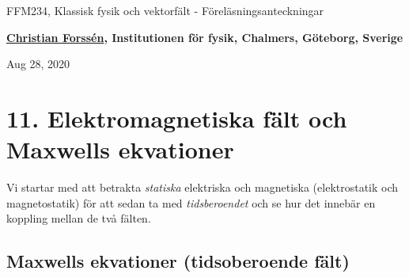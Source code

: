 \documentclass[%
oneside,                 %
final,                   %
10pt]{article}
\begin{document}

\newcommand{\exercisesection}[1]{\subsection*{#1}}







\thispagestyle{empty}

\begin{center}
{\LARGE\bf
\begin{spacing}{1.25}
FFM234, Klassisk fysik och vektorfält - Föreläsningsanteckningar
\end{spacing}
}
\end{center}


\begin{center}
{\bf \href{{http://fy.chalmers.se/subatom/tsp/}}{Christian Forssén}, Institutionen för fysik, Chalmers, Göteborg, Sverige${}^{}$} \\ [0mm]
\end{center}

\begin{center}
\end{center}
    

\begin{center}
Aug 28, 2020
\end{center}

\vspace{1cm}


\section*{11. Elektromagnetiska fält och Maxwells ekvationer}

Vi startar med att betrakta \emph{statiska} elektriska och magnetiska (elektrostatik och magnetostatik) för att sedan ta med \emph{tidsberoendet} och se hur det innebär en koppling mellan de två fälten.

\subsection*{Maxwells ekvationer (tidsoberoende fält)}
\end{document}
